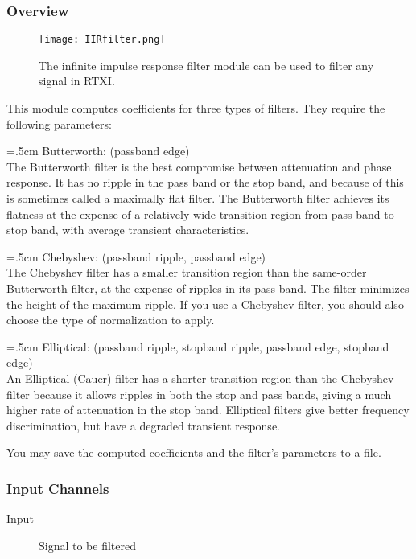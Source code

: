 
\subsubsection{Overview}
\label{IIR Filter}

\begin{figure}[h]
\begin{center}
\texttt{[image: IIRfilter.png]}
\caption[iirfilter]{The infinite impulse response filter module can be used to filter  any signal in RTXI.}
\end{center}
\label{firfilter}
\end{figure}

This module computes coefficients for three types of filters. They require the following parameters:

\hangindent=.5cm Butterworth: (passband edge) \\The Butterworth filter is the best compromise between attenuation and phase response. It has no ripple in the pass band or the stop band, and because of this is sometimes called a maximally flat filter. The Butterworth filter achieves its flatness at the expense of a relatively wide transition region from pass band to stop band, with average transient characteristics.

\hangindent=.5cm Chebyshev: (passband ripple, passband edge)\\The Chebyshev filter has a smaller transition region than the same-order Butterworth filter, at the expense of ripples in its pass band. The filter minimizes the height of the maximum ripple. If you use a Chebyshev filter, you should also choose the type of normalization to apply.

\hangindent=.5cm Elliptical: (passband ripple, stopband ripple, passband edge, stopband edge)\\An Elliptical (Cauer) filter has a shorter transition region than the Chebyshev filter because it allows ripples in both the stop and pass bands, giving a much higher rate of attenuation in the stop band. Elliptical filters give better frequency discrimination, but have a degraded transient response.

You may save the computed coefficients and the filter’s parameters to a file.

\subsubsection{Input Channels}
\begin{description}
\item [Input]Signal to be filtered
\end{description}

